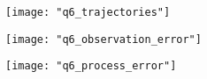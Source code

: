 \documentclass{article}[12 pt]
\begin{document}
\begin{center}
	\begin{figure}[h]
		\centering
		\texttt{[image: "q6\_trajectories"]}
		\caption{ }
		\label{fig:q6_trajectories}
	\end{figure}
\end{center}

\begin{center}
	\begin{figure}[h]
		\centering
		\texttt{[image: "q6\_observation\_error"]}
		\caption{ }
		\label{fig:q6_observation_error}
	\end{figure}
\end{center}

\begin{center}
	\begin{figure}[h]
		\centering
		\texttt{[image: "q6\_process\_error"]}
		\caption{ }
		\label{fig:q6_process_error}
	\end{figure}
\end{center}
\end{document}
